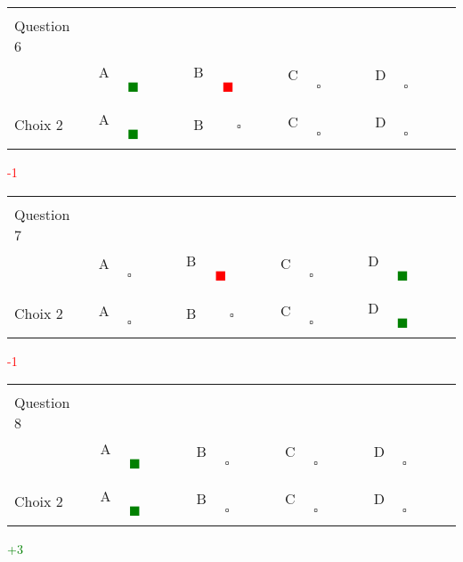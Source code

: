 \documentclass{book}%
\begin{document}
\thispagestyle{empty}%
\begin{center}%
\begin{tabular}{| l  l  l  l  l |}%
\hline%
 & & & & \\%
Question 6\qquad \qquad\ & & & & \\%
& A \textcolor{green}{$\qquad \blacksquare \qquad$}& B \textcolor{red}{$\qquad \blacksquare \qquad$}& C $\qquad \square \qquad$& D $\qquad \square \qquad$\\%
 & & & & \\%
\hline%
 & & & &  \\%
Choix 2& A \textcolor{green}{$\qquad \blacksquare \qquad$}& B $\qquad \square \qquad$& C $\qquad \square \qquad$& D $\qquad \square \qquad$\\%
 & & & &  \\%
\hline%
\end{tabular}%
 \qquad  \textcolor{red}{-1}%
\\ \vskip3mm%
\end{center}%
\thispagestyle{empty}%
\begin{center}%
\begin{tabular}{| l  l  l  l  l |}%
\hline%
 & & & & \\%
Question 7\qquad \qquad\ & & & & \\%
& A $\qquad \square \qquad$& B \textcolor{red}{$\qquad \blacksquare \qquad$}& C $\qquad \square \qquad$& D \textcolor{green}{$\qquad \blacksquare \qquad$}\\%
 & & & & \\%
\hline%
 & & & &  \\%
Choix 2& A $\qquad \square \qquad$& B $\qquad \square \qquad$& C $\qquad \square \qquad$& D \textcolor{green}{$\qquad \blacksquare \qquad$}\\%
 & & & &  \\%
\hline%
\end{tabular}%
 \qquad  \textcolor{red}{-1}%
\\ \vskip3mm%
\end{center}%
\thispagestyle{empty}%
\begin{center}%
\begin{tabular}{| l  l  l  l  l |}%
\hline%
 & & & & \\%
Question 8\qquad \qquad\ & & & & \\%
& A \textcolor{green}{$\qquad \blacksquare \qquad$}& B $\qquad \square \qquad$& C $\qquad \square \qquad$& D $\qquad \square \qquad$\\%
 & & & & \\%
\hline%
 & & & &  \\%
Choix 2& A \textcolor{green}{$\qquad \blacksquare \qquad$}& B $\qquad \square \qquad$& C $\qquad \square \qquad$& D $\qquad \square \qquad$\\%
 & & & &  \\%
\hline%
\end{tabular}%
 \qquad  \textcolor{green}{+3}%
\\ \vskip3mm%
\end{center}%
\end{document}
